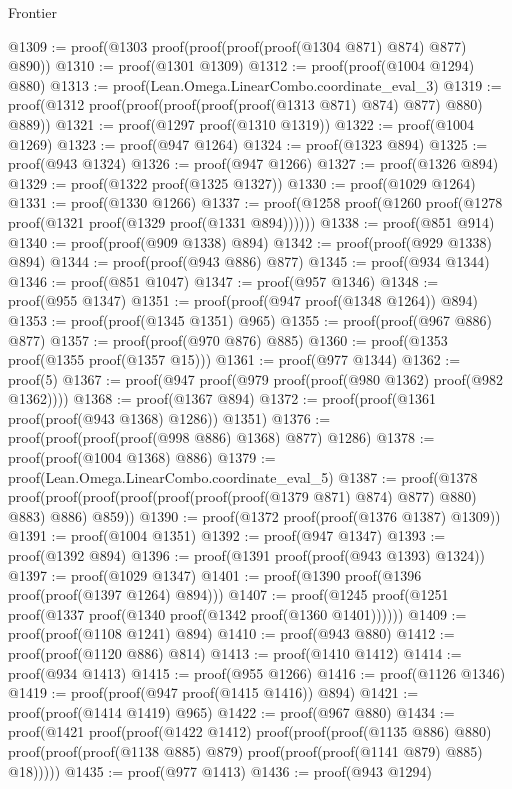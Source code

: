 \begin{lexlean}{Frontier}
\begin{coremodule}
@1309 := proof(@1303 proof(proof(proof(proof(@1304 @871) @874) @877) @890))
@1310 := proof(@1301 @1309)
@1312 := proof(proof(@1004 @1294) @880)
@1313 := proof(Lean.Omega.LinearCombo.coordinate_eval_3)
@1319 := proof(@1312 proof(proof(proof(proof(proof(@1313 @871) @874) @877) @880) @889))
@1321 := proof(@1297 proof(@1310 @1319))
@1322 := proof(@1004 @1269)
@1323 := proof(@947 @1264)
@1324 := proof(@1323 @894)
@1325 := proof(@943 @1324)
@1326 := proof(@947 @1266)
@1327 := proof(@1326 @894)
@1329 := proof(@1322 proof(@1325 @1327))
@1330 := proof(@1029 @1264)
@1331 := proof(@1330 @1266)
@1337 := proof(@1258 proof(@1260 proof(@1278 proof(@1321 proof(@1329 proof(@1331 @894))))))
@1338 := proof(@851 @914)
@1340 := proof(proof(@909 @1338) @894)
@1342 := proof(proof(@929 @1338) @894)
@1344 := proof(proof(@943 @886) @877)
@1345 := proof(@934 @1344)
@1346 := proof(@851 @1047)
@1347 := proof(@957 @1346)
@1348 := proof(@955 @1347)
@1351 := proof(proof(@947 proof(@1348 @1264)) @894)
@1353 := proof(proof(@1345 @1351) @965)
@1355 := proof(proof(@967 @886) @877)
@1357 := proof(proof(@970 @876) @885)
@1360 := proof(@1353 proof(@1355 proof(@1357 @15)))
@1361 := proof(@977 @1344)
@1362 := proof(5)
@1367 := proof(@947 proof(@979 proof(proof(@980 @1362) proof(@982 @1362))))
@1368 := proof(@1367 @894)
@1372 := proof(proof(@1361 proof(proof(@943 @1368) @1286)) @1351)
@1376 := proof(proof(proof(proof(@998 @886) @1368) @877) @1286)
@1378 := proof(proof(@1004 @1368) @886)
@1379 := proof(Lean.Omega.LinearCombo.coordinate_eval_5)
@1387 := proof(@1378
      proof(proof(proof(proof(proof(proof(proof(@1379 @871) @874) @877) @880) @883) @886) @859))
@1390 := proof(@1372 proof(proof(@1376 @1387) @1309))
@1391 := proof(@1004 @1351)
@1392 := proof(@947 @1347)
@1393 := proof(@1392 @894)
@1396 := proof(@1391 proof(proof(@943 @1393) @1324))
@1397 := proof(@1029 @1347)
@1401 := proof(@1390 proof(@1396 proof(proof(@1397 @1264) @894)))
@1407 := proof(@1245 proof(@1251 proof(@1337 proof(@1340 proof(@1342 proof(@1360 @1401))))))
@1409 := proof(proof(@1108 @1241) @894)
@1410 := proof(@943 @880)
@1412 := proof(proof(@1120 @886) @814)
@1413 := proof(@1410 @1412)
@1414 := proof(@934 @1413)
@1415 := proof(@955 @1266)
@1416 := proof(@1126 @1346)
@1419 := proof(proof(@947 proof(@1415 @1416)) @894)
@1421 := proof(proof(@1414 @1419) @965)
@1422 := proof(@967 @880)
@1434 := proof(@1421
      proof(proof(@1422 @1412)
          proof(proof(proof(@1135 @886) @880)
              proof(proof(proof(@1138 @885) @879) proof(proof(proof(@1141 @879) @885) @18)))))
@1435 := proof(@977 @1413)
@1436 := proof(@943 @1294)

\end{coremodule}
\end{lexlean}

